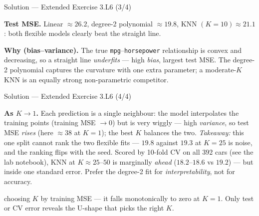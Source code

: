 \documentclass[aspectratio=169,11pt]{beamer}
\begin{document}
\begin{frame}{Solution --- Extended Exercise 3.L6 (3/4)}
  \begin{solutionbox}
    \textbf{Test MSE.} Linear $\approx 26.2$, degree-2 polynomial
    $\approx 19.8$, KNN $(K{=}10)\approx 21.1$: both flexible models
    clearly beat the straight line.

    \textbf{Why (bias--variance).} The true \texttt{mpg}--\texttt{horsepower}
    relationship is convex and decreasing, so a straight line
    \emph{underfits} --- high \emph{bias}, largest test MSE. The degree-2
    polynomial captures the curvature with one extra parameter; a
    moderate-$K$ KNN is an equally strong non-parametric competitor.
  \end{solutionbox}
\end{frame}

\begin{frame}{Solution --- Extended Exercise 3.L6 (4/4)}
  \begin{solutionbox}
    \textbf{As $K\to 1$.} Each prediction is a single neighbour: the model
    interpolates the training points (training MSE $\to 0$) but is very
    wiggly --- high \emph{variance}, so test MSE \emph{rises} (here
    $\approx 38$ at $K{=}1$); the best $K$ balances the two.
    \emph{Takeaway:} this one split cannot rank the two flexible fits ---
    $19.8$ against $19.3$ at $K{=}25$ is noise, and the ranking flips with
    the seed. Scored by 10-fold CV on all $392$ cars (see the lab notebook),
    KNN at $K\approx25$--$50$ is marginally \emph{ahead} ($18.2$--$18.6$ vs
    $19.2$) --- but inside one standard error. Prefer the degree-2 fit for
    \emph{interpretability}, not for accuracy.
  \end{solutionbox}
  \begin{mistake}
    choosing $K$ by training MSE --- it falls
    monotonically to zero at $K=1$. Only test or CV error reveals the
    U-shape that picks the right $K$.
  \end{mistake}
\end{frame}
\end{document}
